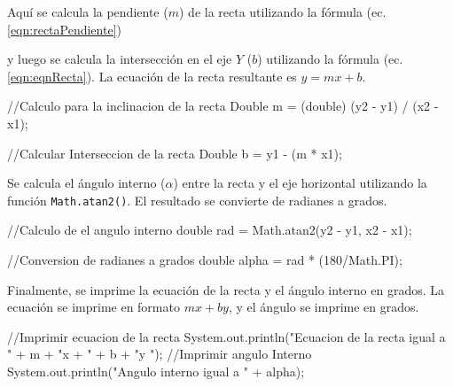 Aquí se calcula la pendiente (\(m\)) de la recta utilizando la fórmula (ec. \ref{eqn:rectaPendiente})

y luego se calcula la intersección en el eje \(Y\) (\(b\)) utilizando la fórmula (ec. \ref{eqn:eqnRecta}). La ecuación de la recta resultante es \(y = mx + b\).

    \begin{javaCode}
        //Calculo para la inclinacion de la recta
        Double m = (double) (y2 - y1) / (x2 - x1);
        
        //Calcular Interseccion de la recta
        Double b = y1 - (m * x1);
    \end{javaCode}

Se calcula el ángulo interno (\(\alpha\)) entre la recta y el eje horizontal utilizando la función \texttt{Math.atan2()}. El resultado se convierte de radianes a grados.

    \begin{javaCode}
        //Calculo de el angulo interno
        double rad = Math.atan2(y2 - y1, x2 - x1);
        
        //Conversion de radianes a grados
        double alpha = rad * (180/Math.PI);
    \end{javaCode}

Finalmente, se imprime la ecuación de la recta y el ángulo interno en grados. La ecuación se imprime en formato \(mx + by\), y el ángulo se imprime en grados.

    \begin{javaCode}
        //Imprimir ecuacion de la recta
        System.out.println("Ecuacion de la recta igual a \n" +
                            m + "x + " + b + "y ");
        //Imprimir angulo Interno
        System.out.println("Angulo interno igual a \n" + alpha);
    \end{javaCode}

